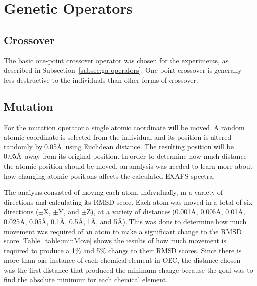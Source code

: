 \section{Genetic Operators}
\label{sec:ga-operators}

\subsection{Crossover}

The basic one-point crossover operator was chosen for the experiments, as described in Subsection~\ref{subsec:ga-operators}. One point crossover is generally less destructive to the individuals than other forms of crossover. %

\subsection{Mutation}
\label{subsec:mutation}

For the mutation operator a single atomic coordinate will be moved. A random atomic coordinate is selected from the individual and its position is altered randomly by 0.05\AA\  using Euclidean distance. The resulting position will be 0.05\AA\ away from its original position. In order to determine how much distance the atomic position should be moved, an analysis was needed to learn more about how changing atomic positions affects the calculated EXAFS spectra.

The analysis consisted of moving each atom, individually, in a variety of directions and calculating its RMSD score. Each atom was moved in a total of six directions ($\pm$X, $\pm$Y, and $\pm$Z), at a variety of distances (0.001\AA, 0.005\AA, 0.01\AA, 0.025\AA, 0.05\AA, 0.1\AA, 0.5\AA, 1\AA, and 5\AA). This was done to determine how much movement was required of an atom to make a significant change to the RMSD score. Table~\ref{table:minMove} shows the results of how much movement is required to produce a 1\% and 5\% change to their RMSD scores. Since there is more than one instance of each chemical element in OEC, the distance chosen was the first distance that produced the minimum change because the goal was to find the absolute minimum for each chemical element.

